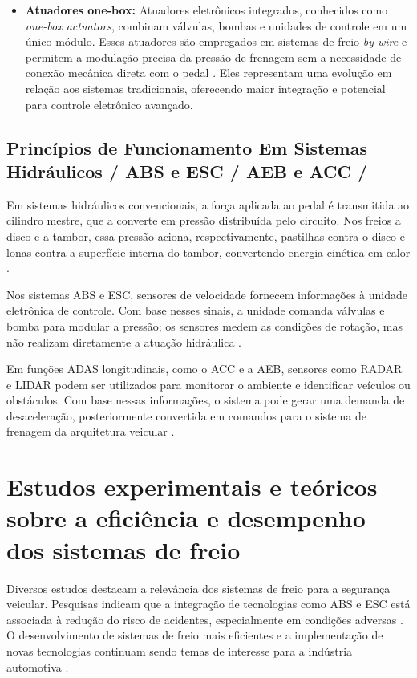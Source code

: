 \begin{itemize}
    \item \textbf{Atuadores one-box:} Atuadores eletrônicos integrados, conhecidos como \textit{one-box actuators}, combinam válvulas, bombas e unidades de controle em um único módulo. Esses atuadores são empregados em sistemas de freio \textit{by-wire} e permitem a modulação precisa da pressão de frenagem sem a necessidade de conexão mecânica direta com o pedal \cite{HouhuaJingShihao2023}. Eles representam uma evolução em relação aos sistemas tradicionais, oferecendo maior integração e potencial para controle eletrônico avançado.

\end{itemize}

\subsection{Princípios de Funcionamento Em Sistemas Hidráulicos / ABS e ESC / AEB e ACC /}
\label{sec:o-estado-da-arte-3-3}
Em sistemas hidráulicos convencionais, a força aplicada ao pedal é transmitida ao cilindro mestre, que a converte em pressão distribuída pelo circuito. Nos freios a disco e a tambor, essa pressão aciona, respectivamente, pastilhas contra o disco e lonas contra a superfície interna do tambor, convertendo energia cinética em calor \cite{Konrad2014, Lentin2022}.

Nos sistemas ABS e ESC, sensores de velocidade fornecem informações à unidade eletrônica de controle. Com base nesses sinais, a unidade comanda válvulas e bomba para modular a pressão; os sensores medem as condições de rotação, mas não realizam diretamente a atuação hidráulica \cite{Konrad2014, AndrewJ2022}.

Em funções ADAS longitudinais, como o \gls{ACC} e a \gls{AEB}, sensores como \gls{RADAR} e \gls{LIDAR} podem ser utilizados para monitorar o ambiente e identificar veículos ou obstáculos. Com base nessas informações, o sistema pode gerar uma demanda de desaceleração, posteriormente convertida em comandos para o sistema de frenagem da arquitetura veicular \cite{LihuaLuo2016,Linhoff2026}.

\section{Estudos experimentais e teóricos sobre a eficiência e desempenho dos sistemas de freio}
\label{sec:o-estado-da-arte-5}
Diversos estudos destacam a relevância dos sistemas de freio para a segurança veicular. Pesquisas indicam que a integração de tecnologias como ABS e ESC está associada à redução do risco de acidentes, especialmente em condições adversas \cite{Rudolf2011, Donghai2022}. O desenvolvimento de sistemas de freio mais eficientes e a implementação de novas tecnologias continuam sendo temas de interesse para a indústria automotiva \cite{AndrewJ2022}.

